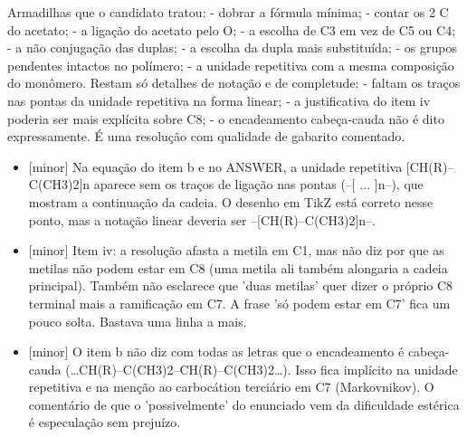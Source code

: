 \documentclass{article}%
\begin{document}
\newline%
Armadilhas que o candidato tratou:\newline%
{-} dobrar a fórmula mínima;\newline%
{-} contar os 2 C do acetato;\newline%
{-} a ligação do acetato pelo O;\newline%
{-} a escolha de C3 em vez de C5 ou C4;\newline%
{-} a não conjugação das duplas;\newline%
{-} a escolha da dupla mais substituída;\newline%
{-} os grupos pendentes intactos no polímero;\newline%
{-} a unidade repetitiva com a mesma composição do monômero.\newline%
\newline%
Restam só detalhes de notação e de completude:\newline%
{-} faltam os traços nas pontas da unidade repetitiva na forma linear;\newline%
{-} a justificativa do item iv poderia ser mais explícita sobre C8;\newline%
{-} o encadeamento cabeça{-}cauda não é dito expressamente.\newline%
\newline%
É uma resolução com qualidade de gabarito comentado.%
\begin{itemize}%
\item%
{[}minor{]} Na equação do item b e no ANSWER, a unidade repetitiva {[}CH(R)--C(CH3)2{]}n aparece sem os traços de ligação nas pontas (--{[} ... {]}n--), que mostram a continuação da cadeia. O desenho em TikZ está correto nesse ponto, mas a notação linear deveria ser --{[}CH(R)--C(CH3)2{]}n--.%
\item%
{[}minor{]} Item iv: a resolução afasta a metila em C1, mas não diz por que as metilas não podem estar em C8 (uma metila ali também alongaria a cadeia principal). Também não esclarece que 'duas metilas' quer dizer o próprio C8 terminal mais a ramificação em C7. A frase 'só podem estar em C7' fica um pouco solta. Bastava uma linha a mais.%
\item%
{[}minor{]} O item b não diz com todas as letras que o encadeamento é cabeça{-}cauda (\ldots{}CH(R)--C(CH3)2--CH(R)--C(CH3)2\ldots{}). Isso fica implícito na unidade repetitiva e na menção ao carbocátion terciário em C7 (Markovnikov). O comentário de que o 'possivelmente' do enunciado vem da dificuldade estérica é especulação sem prejuízo.%
\end{itemize}%
\end{document}
